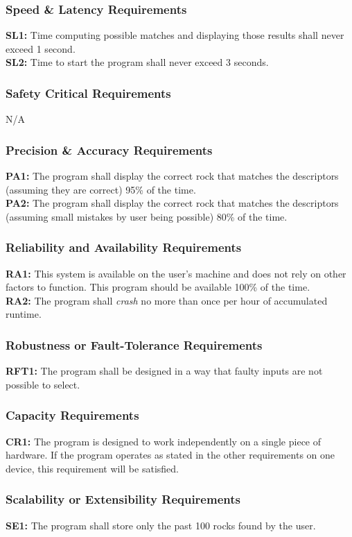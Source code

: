 \documentclass[titlepage]{article}
\begin{document}
\subsubsection{Speed \& Latency Requirements}
\textbf{SL1:} Time computing possible matches and displaying those results shall never exceed 1 second.\\

\noindent\textbf{SL2:} Time to start the program shall never exceed 3 seconds.
\subsubsection{Safety Critical Requirements}
N/A
\subsubsection{Precision \& Accuracy Requirements}
\textbf{PA1:} The program shall display the correct rock that matches the descriptors (assuming they are correct) 95\% of the time.\\

\noindent\textbf{PA2:} The program shall display the correct rock that matches the descriptors (assuming small mistakes by user being possible) 80\% of the time.
\subsubsection{Reliability and Availability Requirements}
\textbf{RA1:} This system is available on the user's machine and does not rely on other factors to function. This program should be available 100\% of the time.\\

\noindent\textbf{RA2:} The program shall \textit{crash} no more than once per hour of accumulated runtime.
\subsubsection{Robustness or Fault-Tolerance Requirements}
\textbf{RFT1:} The program shall be designed in a way that faulty inputs are not possible to select.
\subsubsection{Capacity Requirements}
\textbf{CR1:} The program is designed to work independently on a single piece of hardware. If the program operates as stated in the other requirements on one device, this requirement will be satisfied.
\subsubsection{Scalability or Extensibility Requirements}
\textbf{SE1:} The program shall store only the past 100 rocks found by the user.\\
\end{document}
